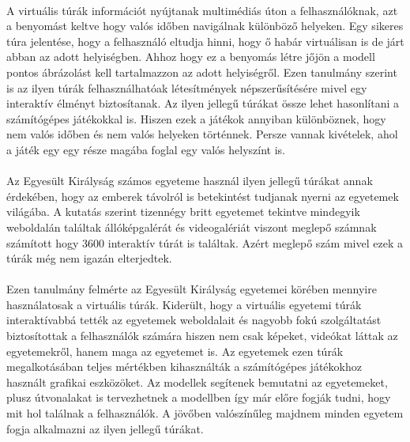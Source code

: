 \paragraph{}
A virtuális túrák információt nyújtanak multimédiás úton a felhasználóknak, azt a benyomást keltve hogy valós időben navigálnak különböző helyeken. Egy sikeres túra jelentése, hogy a felhasználó eltudja hinni, hogy ő habár virtuálisan is de járt abban az adott helyiségben. Ahhoz hogy ez a benyomás létre jőjön a modell pontos ábrázolást kell tartalmazzon az adott helyiségről. Ezen tanulmány szerint is az ilyen túrák felhasználhatóak létesítmények népszerűsítésére mivel egy interaktív élményt biztosítanak. Az ilyen jellegű túrákat össze lehet hasonlítani a számítógépes játékokkal is. Hiszen ezek a játékok annyiban különböznek, hogy nem valós időben és nem valós helyeken történnek. Persze vannak kivételek, ahol a játék egy egy része magába foglal egy valós helyszínt is. 
\paragraph{}
Az Egyesült Királyság számos egyeteme használ ilyen jellegű túrákat annak érdekében, hogy az emberek távolról is betekintést tudjanak nyerni az egyetemek világába. A kutatás szerint tizennégy britt egyetemet tekintve mindegyik weboldalán találtak állóképgalérát és videogalériát viszont meglepő számnak számított hogy 3600 interaktív túrát is találtak. Azért meglepő szám mivel ezek a túrák még nem igazán elterjedtek.
\paragraph{}
Ezen tanulmány felmérte az Egyesült Királyság egyetemei körében mennyire használatosak a virtuális túrák. Kiderült, hogy a virtuális egyetemi túrák interaktívabbá tették az egyetemek weboldalait és nagyobb fokú szolgáltatást biztosítottak a felhasználók számára hiszen nem csak képeket, videókat láttak az egyetemekről, hanem maga az egyetemet is. Az egyetemek ezen túrák megalkotásában teljes mértékben kihasználták  a számítógépes játékokhoz használt grafikai eszközöket. Az modellek segítenek bemutatni az egyetemeket, plusz útvonalakat is tervezhetnek a modellben így már előre fogják tudni, hogy mit hol találnak a felhasználók. A jövőben valószínűleg majdnem minden egyetem fogja alkalmazni az ilyen jellegű túrákat.\cite{maines2015application}
